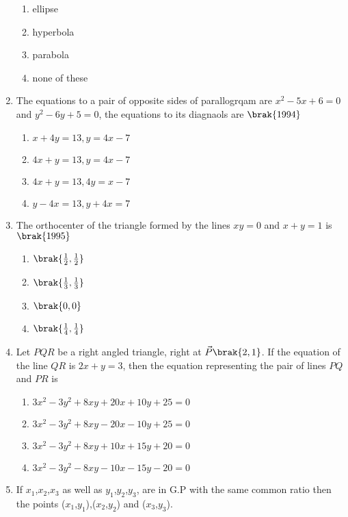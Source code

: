 \begin{enumerate}[label=\thesubsection.\arabic*.,ref=\thesubsection.\theenumi]
\begin{multicols}{2}
\begin{enumerate}
       \item ellipse
       \item hyperbola
       \item parabola
       \item none of these
\end{enumerate}
\end{multicols}
\item The equations to a pair of opposite sides of parallogrqam are $x^2-5x+6=0$ and $y^2-6y+5=0$, the equations to its diagnaols are 
\hfill{$\brak{1994}$}
\begin{multicols}{2}
\begin{enumerate}
      \item $x+4y=13,y=4x-7$
    \item $4x+y=13,y=4x-7$
      \item $4x+y=13,4y=x-7$
        \item $y-4x=13,y+4x=7$
\end{enumerate}
\end{multicols}
\item The orthocenter of the triangle formed by the lines $xy=0$ and $x+y=1$ is 
\hfill{$\brak{1995}$}
\begin{multicols}{4}
\begin{enumerate}
      \item $\brak{\frac{1}{2},\frac{1}{2}}$
      \item $\brak{\frac{1}{3},\frac{1}{3}}$
      \item $\brak{0,0}$
      \item $\brak{\frac{1}{4},\frac{1}{4}}$
\end{enumerate}
\end{multicols}
\item Let $PQR$ be a right angled triangle, right at $\vec{P}\brak{2,1}$. If the equation of the line $QR$ is $2x+y=3$, then the equation representing the pair of lines $PQ$ and $PR$ is
\hfill {}
\begin{multicols}{2}
\begin{enumerate}
    \item $3x^2-3y^2+8xy+20x+10y+25=0$
    \item $3x^2-3y^2+8xy-20x-10y+25=0$
    \item $3x^2-3y^2+8xy+10x+15y+20=0$
    \item $3x^2-3y^2-8xy-10x-15y-20=0$
\end{enumerate}
\end{multicols}
\item If $x_1$,$x_2$,$x_3$ as well as $y_1$,$y_2$,$y_3$, are in G.P with the same common ratio then the points ($x_1$,$y_1$),($x_2$,$y_2$) and ($x_3$,$y_3$).

\end{enumerate}
